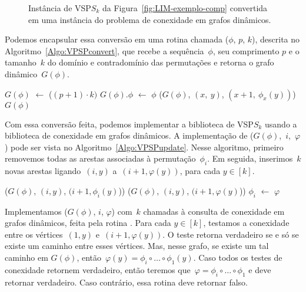 \begin{figure}[htb]
\centering

\caption{Instância de VSP$S_k$ da Figura~\ref{fig:LIM-exemplo-comp} convertida em uma instância do problema de conexidade em grafos dinâmicos.}
\label{fig:LIM-convertido}
\end{figure}

Podemos encapsular essa conversão em uma rotina chamada \VPSPconvert($\phi$, $p$, $k$), descrita no Algoritmo~\ref{Algo:VPSPconvert}, que recebe a sequência~$\phi$, seu comprimento $p$ e o tamanho~$k$ do domínio e contradomínio das permutações e retorna o grafo dinâmico~$G(\phi)$.

\begin{algorithm}[htb]
\caption{\VPSPconvert($\phi$, $p$, $k$)}
\label{Algo:VPSPconvert}
\begin{algorithmic}[1]
\State $G(\phi)$ $\gets$ \dymGraphCreate($(p+1)\cdot k)$
\State $G(\phi).\phi$ $\gets$ $\phi$
    \State \dymGraphAddEdge($G(\phi)$, $(x,~y)$, $(x+1, ~\phi_x(y))$)
  \EndFor
\EndFor
\State \Return $G(\phi)$
\end{algorithmic}
\end{algorithm}


Com essa conversão feita, podemos implementar a biblioteca de VSP$S_k$ usando a biblioteca de conexidade em grafos dinâmicos. A implementação de \mbox{\VPSPupdate($G(\phi)$, $i$,~$\varphi$)} pode ser vista no Algoritmo~\ref{Algo:VPSPupdate}. Nesse algoritmo, primeiro removemos todas as arestas associadas à permutação~$\phi_i$. Em seguida, inserimos~$k$ novas arestas ligando~$(i,y)$ a~${(i+1,\varphi(y))}$, para cada $y\in[k]$.


\begin{algorithm}[htb]
\caption{\VPSPupdate($G(\phi)$, $i$, $\varphi$)}
\label{Algo:VPSPupdate}
\begin{algorithmic}[1]
  \State \dymGraphDelEdge($G(\phi)$, $(i,y)$, $(i+1,\phi_i(y)$))
\EndFor
{}
  \State \dymGraphAddEdge($G(\phi)$, $(i,y)$, $(i+1,\varphi(y)$))
\EndFor
\State $\phi_i$ $\gets$ $\varphi$ 
\end{algorithmic}
\end{algorithm}


Implementamos \VPSPverify($G(\phi)$, $i$, $\varphi$) com~$k$ chamadas à consulta de conexidade em grafos dinâmicos, feita pela rotina \dymGraphQuery{}. Para cada $y\in[k]$, testamos a conexidade entre os vértices~$(1,y)$ e~$(i+1,\varphi(y))$. O teste retorna verdadeiro se e só se existe um caminho entre esses vértices. Mas, nesse grafo, se existe um tal caminho em $G(\phi)$, então~$\varphi(y) = \phi_i\circ\dots\circ\phi_1(y)$. Caso todos os testes de conexidade retornem verdadeiro, então teremos que~$\varphi = \phi_i\circ\dots\circ\phi_1$ e \VPSPverify{} deve retornar verdadeiro. Caso contrário, essa rotina deve retornar falso. 

